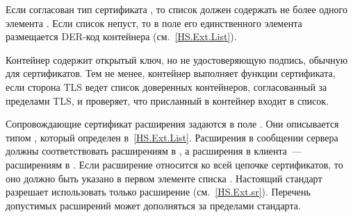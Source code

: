 
Если согласован тип сертификата , то 
список  должен содержать не более одного 
элемента . Если список непуст, то в поле 
 его единственного элемента размещается 
DER-код контейнера  (см.~\ref{HS.Ext.List}).

\begin{note*}
Контейнер  содержит открытый ключ, но не 
удостоверяющую подпись, обычную для сертификатов. Тем не менее, 
контейнер выполняет функции сертификата, если сторона TLS ведет список
доверенных контейнеров, согласованный за пределами TLS, и проверяет,
что присланный в  контейнер входит в список.
\end{note*}



Сопровождающие сертификат расширения задаются в поле 
.
%
Они описывается типом , который определен в~\ref{HS.Ext.List}.
%
Расширения в сообщении  сервера должны соответствовать 
расширениям в ,  
а расширения в  клиента~--- расширениям в 
.
%
Если расширение относится ко всей цепочке сертификатов, то оно должно быть 
указано в первом элементе списка .
%
Настоящий стандарт разрешает использовать только расширение 
 (см.~\ref{HS.Ext.sr}). Перечень допустимых расширений 
может дополняться за пределами стандарта.

